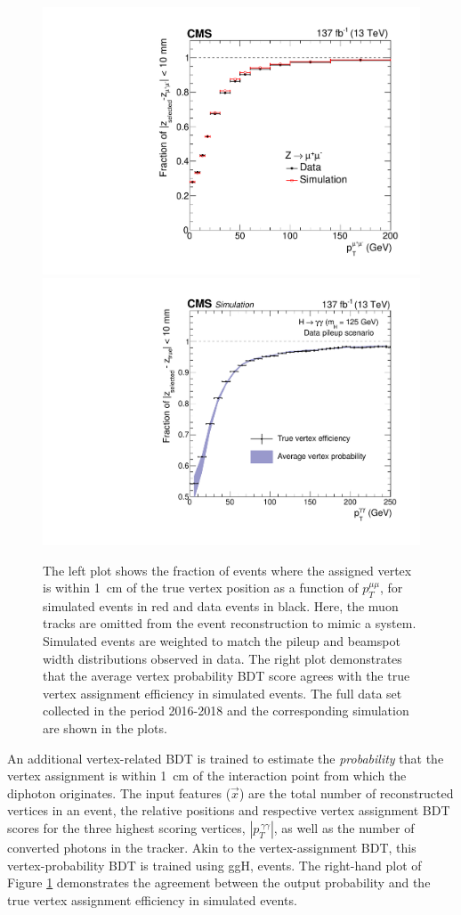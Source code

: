 \begin{figure}[htb!]
  \centering
  \includegraphics[width=.49\textwidth]{Figures/hgg_overview/Zmumu_eff_vs_pt_All.pdf}
  \includegraphics[width=.49\textwidth]{Figures/hgg_overview/AverageProbPlotFullRunIIVersusPt.pdf}
  \caption[Vertex-assignment and vertex-probability BDT]
  {
    The left plot shows the fraction of \Zmumu events where the assigned vertex is within 1~cm of the true vertex position as a function of $p_T^{\mu\mu}$, for simulated events in red and data events in black. Here, the muon tracks are omitted from the event reconstruction to mimic a \Hgg system. Simulated events are weighted to match the pileup and beamspot width distributions observed in data. The right plot demonstrates that the average vertex probability BDT score agrees with the true vertex assignment efficiency in simulated events. The full data set collected in the period 2016-2018 and the corresponding simulation are shown in the plots.
  }
  \label{fig:vertex_selection_0}
\end{figure}

An additional vertex-related BDT is trained to estimate the \textit{probability} that the vertex assignment is within 1~cm of the interaction point from which the diphoton originates. The input features ($\vec{x}$) are the total number of reconstructed vertices in an event, the relative positions and respective vertex assignment BDT scores for the three highest scoring vertices, $|{p}_T^{\,\gamma\gamma}|$, as well as the number of converted photons in the tracker. Akin to the vertex-assignment BDT, this vertex-probability BDT is trained using ggH, \Hgg events. The right-hand plot of Figure \ref{fig:vertex_selection_0} demonstrates the agreement between the output probability and the true vertex assignment efficiency in simulated events.

